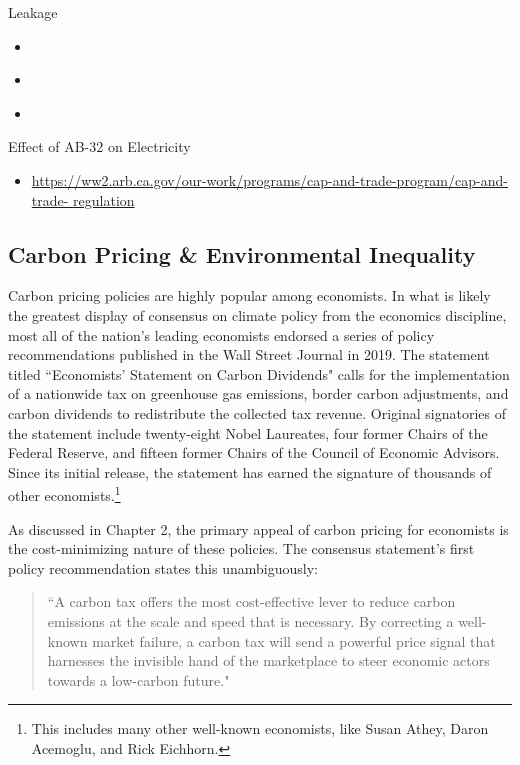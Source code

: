 \noindent Leakage
\begin{itemize}
    \item \cite{burtraw2018}
    \item \cite{fowlie2009incomplete}
    \item \cite{fowlie2021border}
\end{itemize}

\noindent Effect of AB-32 on Electricity
\begin{itemize}
    \item \url{https://ww2.arb.ca.gov/our-work/programs/cap-and-trade-program/cap-and-trade-
    regulation}
\end{itemize}

\subsection{Carbon Pricing \& Environmental Inequality}

Carbon pricing policies are highly popular among economists. In what is likely the greatest display of consensus on climate policy from the economics discipline, most all of the nation's leading economists endorsed a series of policy recommendations published in the Wall Street Journal in 2019. The statement titled ``Economists' Statement on Carbon Dividends" calls for the implementation of a nationwide tax on greenhouse gas emissions, border carbon adjustments, and carbon dividends to redistribute the collected tax revenue. Original signatories of the statement include twenty-eight Nobel Laureates, four former Chairs of the Federal Reserve, and fifteen former Chairs of the Council of Economic Advisors. Since its initial release, the statement has earned the signature of thousands of other economists.\footnote{This includes many other well-known economists, like Susan Athey, Daron Acemoglu, and Rick Eichhorn.}

As discussed in Chapter 2, the primary appeal of carbon pricing for economists is the cost-minimizing nature of these policies. The consensus statement's first policy recommendation states this unambiguously:
\begin{quote}
    ``A carbon tax offers the most cost-effective lever to reduce carbon emissions at the scale and speed that is necessary. By correcting a well-known market failure, a carbon tax will send a powerful price signal that harnesses the invisible hand of the marketplace to steer economic actors towards a low-carbon future." 
\end{quote}




